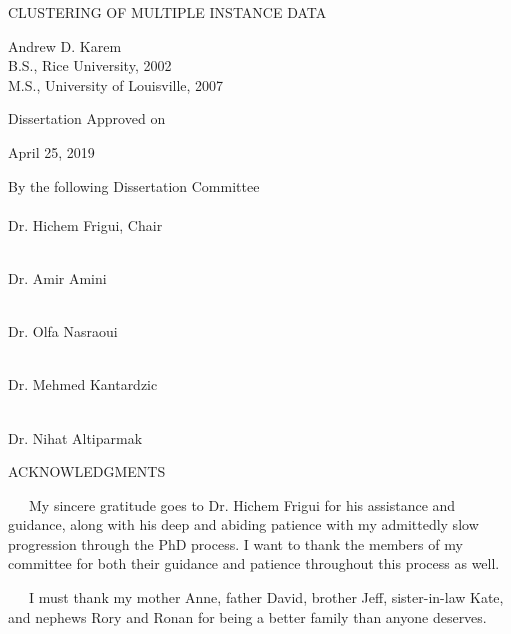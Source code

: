 \documentclass[12pt,dvips]{report}
\numberwithin{equation}{section}
\begin{document}
\begin{center}


{\Large 
CLUSTERING OF MULTIPLE INSTANCE DATA}

\vfill

\singlespacing
Andrew D. Karem \\
B.S., Rice University, 2002 \\
M.S., University of Louisville, 2007

\vfill

Dissertation Approved on\\

\vfill

April 25, 2019\\ %

\vfill

By the following Dissertation Committee\\

\vfill
\makebox[3in]{\hrulefill}\\
Dr. Hichem Frigui, Chair 

\smallskip
\makebox[3in]{\hrulefill}\\
Dr. Amir Amini  %

\smallskip
\makebox[3in]{\hrulefill}\\
Dr. Olfa Nasraoui  %

\smallskip
\makebox[3in]{\hrulefill}\\
Dr. Mehmed Kantardzic %

\smallskip
\makebox[3in]{\hrulefill}\\
Dr. Nihat Altiparmak %

\vfill

\end{center}

\pagebreak

\begin{center}

ACKNOWLEDGMENTS \\

\end{center}

\ \ \ My sincere gratitude goes to Dr. Hichem Frigui for his assistance and guidance, along with his deep and abiding patience with my admittedly slow progression through the PhD process.  I want to thank the members of my committee for both their guidance and patience throughout this process as well.

\ \ \ I must thank my mother Anne, father David, brother Jeff, sister-in-law Kate, and nephews Rory and Ronan for being a better family than anyone deserves.
\end{document}
